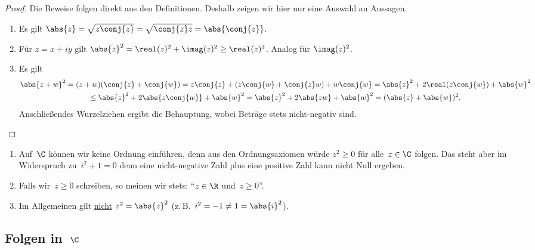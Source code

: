 \documentclass[a4paper]{article}
\begin{document}
\begin{proof}
    Die Beweise folgen direkt aus den Definitionen. Deshalb zeigen wir hier nur eine Auswahl an Aussagen.
    \begin{enumerate}[start=2]
        \item Es gilt $\abs{z} = \sqrt{z\conj{z}} = \sqrt{\conj{z}z} = \abs{\conj{z}}$.
        \item Für $z = x+iy$ gilt $\abs{z}^2 = \real(z)^2 + \imag(z)^2 \geq \real(z)^2$. Analog für $\imag(z)^2$.
        \item Es gilt
        \begin{multline*}
            \abs{z+w}^2 = (z+w)(\conj{z}+\conj{w}) = z\conj{z} + (z\conj{w} + \conj{z}w) + w\conj{w} = \abs{z}^2 + 2\real(z\conj{w}) + \abs{w}^2 \\
            \leq \abs{z}^2 + 2\abs{z\conj{w}} + \abs{w}^2 = \abs{z}^2 + 2\abs{zw} + \abs{w}^2 = (\abs{z}+\abs{w})^2.
        \end{multline*}
        Anschließendes Wurzelziehen ergibt die Behauptung, wobei Beträge stets nicht-negativ sind.\qedhere
    \end{enumerate}
\end{proof}


\begin{remark}\leavevmode
    \begin{enumerate}
        \item Auf~$\C$ können wir keine Ordnung einführen, denn aus den Ordnungsaxiomen würde $z^2 \geq 0$ für alle~$z \in \C$ folgen. Das steht aber im Widerspruch zu~$i^2+1 = 0$ denn eine nicht-negative Zahl plus eine positive Zahl kann nicht Null ergeben.
        \item Falls wir~$z \geq 0$ schreiben, so meinen wir stets: "`$z \in \R$ und~$z \geq 0$"'.
        \item Im Allgemeinen gilt \underline{nicht} $z^2 = \abs{z}^2$ (z.\,B.\ $i^2 = -1 \neq 1 = \abs{i}^2$).
    \end{enumerate}
\end{remark}

\subsection{Folgen in~\texorpdfstring{$\C$}{C}}
\end{document}

